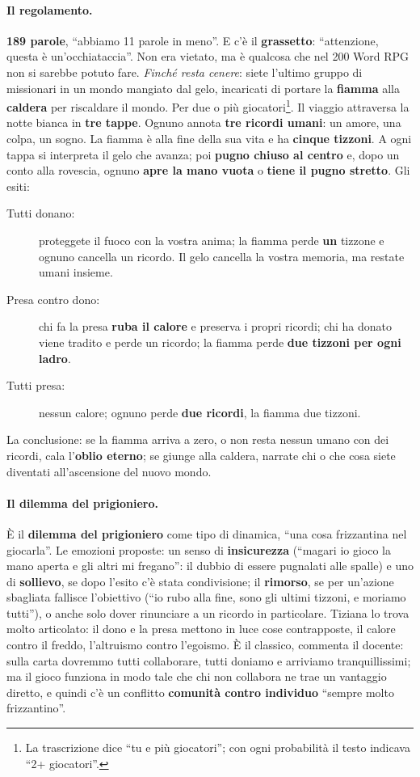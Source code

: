 \paragraph{Il regolamento.} \textbf{189 parole}, ``abbiamo 11 parole in meno''. E c'è
il \textbf{grassetto}: ``attenzione, questa è un'occhiataccia''. Non era vietato, ma è
qualcosa che nel 200 Word RPG non si sarebbe potuto fare. \emph{Finché resta cenere}:
siete l'ultimo gruppo di missionari in un mondo mangiato dal gelo, incaricati di
portare la \textbf{fiamma} alla \textbf{caldera} per riscaldare il mondo. Per due o più
giocatori\footnote{La trascrizione dice ``tu e più giocatori''; con ogni probabilità
il testo indicava ``2+ giocatori''.}. Il viaggio attraversa la notte bianca in
\textbf{tre tappe}. Ognuno annota \textbf{tre ricordi umani}: un amore, una colpa, un
sogno. La fiamma è alla fine della sua vita e ha \textbf{cinque tizzoni}. A ogni tappa
si interpreta il gelo che avanza; poi \textbf{pugno chiuso al centro} e, dopo un
conto alla rovescia, ognuno \textbf{apre la mano vuota} o \textbf{tiene il pugno
stretto}. Gli esiti:
\begin{description}
  \item[Tutti donano:] proteggete il fuoco con la vostra anima; la fiamma perde
        \textbf{un} tizzone e ognuno cancella un ricordo. Il gelo cancella la vostra
        memoria, ma restate umani insieme.
  \item[Presa contro dono:] chi fa la presa \textbf{ruba il calore} e preserva i
        propri ricordi; chi ha donato viene tradito e perde un ricordo; la fiamma
        perde \textbf{due tizzoni per ogni ladro}.
  \item[Tutti presa:] nessun calore; ognuno perde \textbf{due ricordi}, la fiamma due
        tizzoni.
\end{description}
La conclusione: se la fiamma arriva a zero, o non resta nessun umano con dei ricordi,
cala l'\textbf{oblio eterno}; se giunge alla caldera, narrate chi o che cosa siete
diventati all'ascensione del nuovo mondo.

\paragraph{Il dilemma del prigioniero.} È il \textbf{dilemma del prigioniero} come
tipo di dinamica, ``una cosa frizzantina nel giocarla''. Le emozioni proposte: un
senso di \textbf{insicurezza} (``magari io gioco la mano aperta e gli altri mi
fregano'': il dubbio di essere pugnalati alle spalle) e uno di \textbf{sollievo}, se
dopo l'esito c'è stata condivisione; il \textbf{rimorso}, se per un'azione sbagliata
fallisce l'obiettivo (``io rubo alla fine, sono gli ultimi tizzoni, e moriamo
tutti''), o anche solo dover rinunciare a un ricordo in particolare. Tiziana lo trova
molto articolato: il dono e la presa mettono in luce cose contrapposte, il calore
contro il freddo, l'altruismo contro l'egoismo. È il classico, commenta il docente:
sulla carta dovremmo tutti collaborare, tutti doniamo e arriviamo tranquillissimi;
ma il gioco funziona in modo tale che chi non collabora ne trae un vantaggio diretto,
e quindi c'è un conflitto \textbf{comunità contro individuo} ``sempre molto
frizzantino''.

